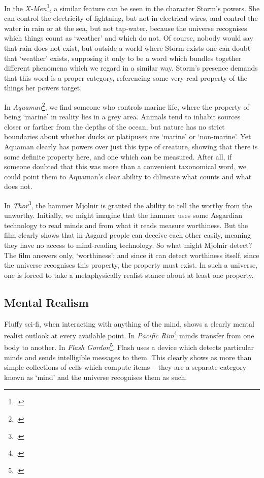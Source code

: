 \documentclass{article}
\begin{document}
In the \textit{X-Men}\footcite{xmen}, a similar feature can be seen in the character Storm's powers. She can control the electricity of lightning, but not in electrical wires, and control the water in rain or at the sea, but not tap-water, because the universe recognises which things count as `weather' and which do not. Of course, nobody would say that rain does not exist, but outside a world where Storm exists one can doubt that `weather' exists, supposing it only to be a word which bundles together different phenomena which we regard in a similar way. Storm's presence demands that this word is a proper category, referencing some very real property of the things her powers target.

In \textit{Aquaman}\footcite{aquaman}, we find someone who controls marine life, where the property of being `marine' in reality lies in a grey area. Animals tend to inhabit sources closer or farther from the depths of the ocean, but nature has no strict boundaries about whether ducks or platipuses are `marine' or `non-marine'. Yet Aquaman clearly has powers over just this type of creature, showing that there is some definite property here, and one which can be measured. After all, if someone doubted that this was more than a convenient taxonomical word, we could point them to Aquaman's clear ability to dilineate what counts and what does not.

In \textit{Thor}\footcite{thor}, the hammer Mjolnir is granted the ability to tell the worthy from the unworthy. Initially, we might imagine that the hammer uses some Asgardian technology to read minds and from what it reads measure worthiness. But the film clearly shows that in Asgard people can deceive each other easily, meaning they have no access to mind-reading technology. So what might Mjolnir detect?  The film answers only, `worthiness'; and since it can detect worthiness itself, since the universe recognises this property, the property must exist. In such a universe, one is forced to take a metaphysically realist stance about at least one property.

\subsection{Mental Realism}
Fluffy sci-fi, when interacting with anything of the mind, shows a clearly mental realist outlook at every available point. In \textit{Pacific Rim}\footcite{pacificrim} minds transfer from one body to another. In \textit{Flash Gordon}\footcite{flashgordon}, Flash uses a device which detects particular minds and sends intelligible messages to them. This clearly shows as more than simple collections of cells which compute items -- they are a separate category known as `mind' and the universe recognises them as such.
\end{document}

